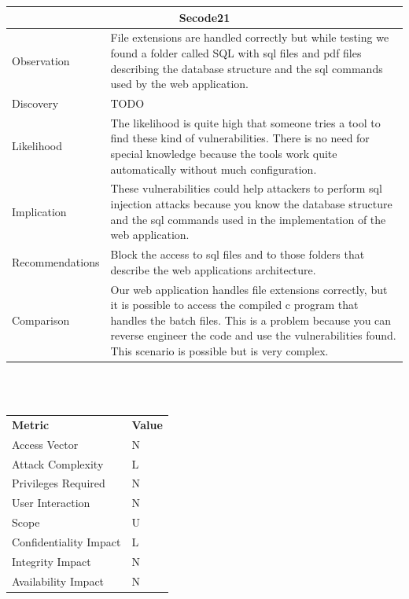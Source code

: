 \documentclass[headsepline,footsepline,footinclude=false,oneside,fontsize=11pt,paper=a4,listof=totoc,bibliography=totoc]{scrbook} %
\begin{document}
\begin{tabular}{ l|p{11cm}  }
	\hline
	\multicolumn{2}{c}{\textbf{Secode21}} \\
	\hline
	Observation   & File extensions are handled correctly but while testing we found a folder called SQL with sql files and pdf files describing the database structure and the sql commands used by the web application.    \\
	Discovery  & TODO \\
	Likelihood & The likelihood is quite high that someone tries a tool to find these kind of vulnerabilities. There is no need for special knowledge because the tools work quite automatically without much configuration. \\
	Implication    & These vulnerabilities could help attackers to perform sql injection attacks because you know the database structure and the sql commands used in the implementation of the web application. \\
	Recommendations& Block the access to sql files and to those folders that describe the web applications architecture. \\
	Comparison& Our web application handles file extensions correctly, but it is possible to access the compiled c program that handles the batch files. This is a problem because you can reverse engineer the code and use the vulnerabilities found. This scenario is possible but is very complex. \\
	\hline
\end{tabular}
\\
\vspace{0.5cm}
\\
\begin{center}
	\begin{tabular}{ll}
		\rowcolor[HTML]{34CDF9}
		{\color[HTML]{ECF4FF} \textbf{Metric}}        & {\color[HTML]{ECF4FF} \textbf{Value}} \\
		\rowcolor[HTML]{BBDAFF}
		{\color[HTML]{333333} Access Vector}          & {\color[HTML]{333333} } N              \\
		\rowcolor[HTML]{ECF4FF}
		{\color[HTML]{333333} Attack Complexity}      & {\color[HTML]{333333} } L              \\
		\rowcolor[HTML]{BBDAFF}
		{\color[HTML]{333333} Privileges Required}    & {\color[HTML]{333333} } N              \\
		\rowcolor[HTML]{ECF4FF}
		{\color[HTML]{333333} User Interaction}       & {\color[HTML]{333333} } N              \\
		\rowcolor[HTML]{BBDAFF}
		{\color[HTML]{333333} Scope}                  & {\color[HTML]{333333} } U              \\
		\rowcolor[HTML]{ECF4FF}
		{\color[HTML]{333333} Confidentiality Impact} & {\color[HTML]{333333} } L              \\
		\rowcolor[HTML]{BBDAFF}
		{\color[HTML]{333333} Integrity Impact}       & {\color[HTML]{333333} } N              \\
		\rowcolor[HTML]{ECF4FF}
		{\color[HTML]{333333} Availability Impact}    & {\color[HTML]{333333} } N
	\end{tabular}
\end{center}
\pagebreak
\end{document}
